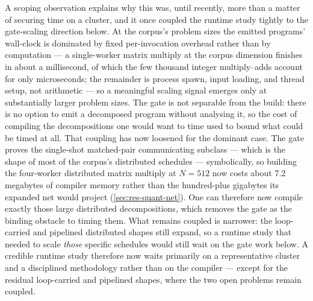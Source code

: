 A scoping observation explains why this was, until recently, more than a matter of
securing time on a cluster, and it once coupled the runtime study tightly to the
gate-scaling direction below. At the corpus's problem sizes the emitted programs'
wall-clock is dominated by fixed per-invocation overhead rather than by computation ---
a single-worker matrix multiply at the corpus dimension finishes in about a
millisecond, of which the few thousand integer multiply--adds account for only
microseconds; the remainder is process spawn, input loading, and thread setup, not
arithmetic --- so a meaningful scaling signal emerges only at substantially larger
problem sizes. The gate is not separable from the build: there is no option to emit a
decomposed program without analysing it, so the cost of compiling the decompositions
one would want to time used to bound what could be timed at all. That coupling has now
loosened for the dominant case. The gate proves the single-shot matched-pair
communicating subclass --- which is the shape of most of the corpus's distributed
schedules --- symbolically, so building the four-worker distributed matrix multiply at
$N=512$ now costs about 7.2\,megabytes of compiler memory rather than the hundred-plus
gigabytes its expanded net would project (\cref{sec:res-quant-net}). One can therefore
now compile exactly those large distributed decompositions, which removes the gate as
the binding obstacle to timing them. What remains coupled is narrower: the loop-carried
and pipelined distributed shapes still expand, so a runtime study that needed to scale
\emph{those} specific schedules would still wait on the gate work below. A credible
runtime study therefore now waits primarily on a representative cluster and a
disciplined methodology rather than on the compiler --- except for the residual
loop-carried and pipelined shapes, where the two open problems remain coupled.

